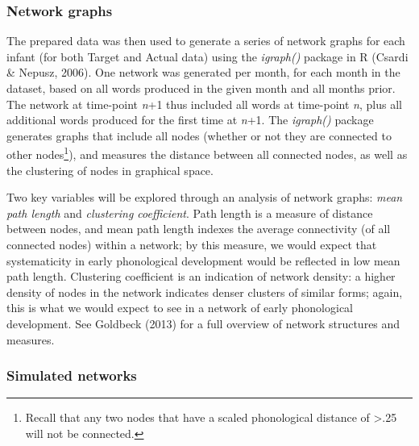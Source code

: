 \documentclass[
  man]{apa6}
\begin{document}
\hypertarget{network-graphs}{%
\subsubsection{Network graphs}\label{network-graphs}}

The prepared data was then used to generate a series of network graphs for each infant (for both Target and Actual data) using the \emph{igraph()} package in R (Csardi \& Nepusz, 2006). One network was generated per month, for each month in the dataset, based on all words produced in the given month and all months prior. The network at time-point \emph{n}+1 thus included all words at time-point \emph{n}, plus all additional words produced for the first time at \emph{n}+1. The \emph{igraph()} package generates graphs that include all nodes (whether or not they are connected to other nodes\footnote{Recall that any two nodes that have a scaled phonological distance of \textgreater.25 will not be connected.}), and measures the distance between all connected nodes, as well as the clustering of nodes in graphical space.

Two key variables will be explored through an analysis of network graphs: \emph{mean path length} and \emph{clustering coefficient}. Path length is a measure of distance between nodes, and mean path length indexes the average connectivity (of all connected nodes) within a network; by this measure, we would expect that systematicity in early phonological development would be reflected in low mean path length. Clustering coefficient is an indication of network density: a higher density of nodes in the network indicates denser clusters of similar forms; again, this is what we would expect to see in a network of early phonological development. See Goldbeck (2013) for a full overview of network structures and measures.

\hypertarget{simulated-networks}{%
\subsubsection{Simulated networks}\label{simulated-networks}}
\end{document}
